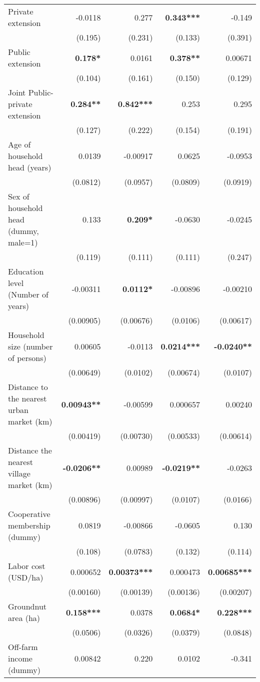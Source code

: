 \documentclass[
]{article}
\begin{document}
\begin{longtable}[t]{lrrrr}
\endfoot
\bottomrule
\endlastfoot
Private extension & -0.0118 & 0.277 & \textbf{0.343***} & -0.149\\
 & (0.195) & (0.231) & (0.133) & (0.391)\\
Public extension & \textbf{0.178*} & 0.0161 & \textbf{0.378**} & 0.00671\\
 & (0.104) & (0.161) & (0.150) & (0.129)\\
Joint Public-private extension & \textbf{0.284**} & \textbf{0.842***} & 0.253 & 0.295\\
 & (0.127) & (0.222) & (0.154) & (0.191)\\
Age of household head (years) & 0.0139 & -0.00917 & 0.0625 & -0.0953\\
 & (0.0812) & (0.0957) & (0.0809) & (0.0919)\\
Sex of household head (dummy, male=1) & 0.133 & \textbf{0.209*} & -0.0630 & -0.0245\\
 & (0.119) & (0.111) & (0.111) & (0.247)\\
Education level (Number of years) & -0.00311 & \textbf{0.0112*} & -0.00896 & -0.00210\\
 & (0.00905) & (0.00676) & (0.0106) & (0.00617)\\
Household size (number of persons) & 0.00605 & -0.0113 & \textbf{0.0214***} & \textbf{-0.0240**}\\
 & (0.00649) & (0.0102) & (0.00674) & (0.0107)\\
Distance to the nearest urban market (km) & \textbf{0.00943**} & -0.00599 & 0.000657 & 0.00240\\
 & (0.00419) & (0.00730) & (0.00533) & (0.00614)\\
Distance the nearest village market (km) & \textbf{-0.0206**} & 0.00989 & \textbf{-0.0219**} & -0.0263\\
 & (0.00896) & (0.00997) & (0.0107) & (0.0166)\\
Cooperative membership (dummy) & 0.0819 & -0.00866 & -0.0605 & 0.130\\
 & (0.108) & (0.0783) & (0.132) & (0.114)\\
Labor cost (USD/ha) & 0.000652 & \textbf{0.00373***} & 0.000473 & \textbf{0.00685***}\\
 & (0.00160) & (0.00139) & (0.00136) & (0.00207)\\
Groundnut area (ha) & \textbf{0.158***} & 0.0378 & \textbf{0.0684*} & \textbf{0.228***}\\
 & (0.0506) & (0.0326) & (0.0379) & (0.0848)\\
Off-farm income (dummy) & 0.00842 & 0.220 & 0.0102 & -0.341\\

\end{longtable}
\end{document}
